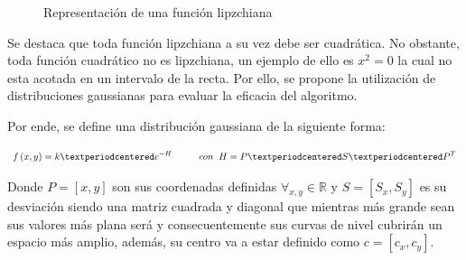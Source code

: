 \begin{figure}[htb]
  \begin{center}
    \caption{Representación de una función lipzchiana}
    \label{FunGauss}
  \end{center}
\end{figure}

Se destaca que toda función lipzchiana a su vez debe ser cuadrática. No obstante, toda función cuadrático no es lipzchiana, un ejemplo de ello es $x^2 = 0$ la cual no esta acotada en un intervalo de la recta. Por ello, se propone la utilización de distribuciones gaussianas para evaluar la eficacia del algoritmo.

Por ende, se define una distribución gaussiana de la siguiente forma:

\begin{equation*}
	f\left(x,y\right)=k·e^{-H}\hspace{10mm}con\hspace{2mm}H=P·S·P^{T}
\end{equation*}

Donde $P=\left[x,y\right]$ son sus coordenadas definidas $\forall_{x,y}\in\mathbb{R}$ y $S=\left[S_x,S_y\right]$ es su desviación siendo una matriz cuadrada y diagonal que mientras más grande sean sus valores más plana será y consecuentemente sus curvas de nivel cubrirán un espacio más amplio, además, su centro va a estar definido como $c=\left[c_x,c_y\right]$.

